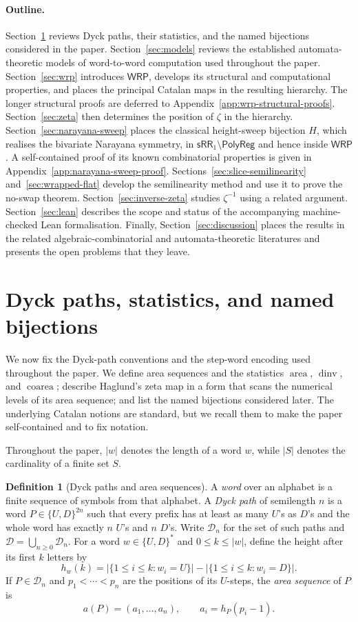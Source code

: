 \documentclass[11pt]{article}
\theoremstyle{definition}
\newtheorem{definition}[theorem]{Definition}
\newcommand{\D}{\mathcal D}
\newcommand{\WRP}{\mathsf{WRP}}
\newcommand{\SWR}{\mathsf{sRR}_1}
\newcommand{\area}{\operatorname{area}}
\newcommand{\dinv}{\operatorname{dinv}}
\newcommand{\coarea}{\operatorname{coarea}}
\newcommand{\polyreg}{\mathsf{PolyReg}}
\begin{document}
\paragraph{Outline.}

Section~\ref{sec:dyck} reviews Dyck paths, their statistics, and the named
bijections considered in the paper.  Section~\ref{sec:models} reviews the
established automata-theoretic models of word-to-word computation used
throughout the paper.  Section~\ref{sec:wrp} introduces $\WRP$, develops its
structural and computational properties, and places the principal Catalan
maps in the resulting hierarchy.  The longer structural proofs are deferred
to Appendix~\ref{app:wrp-structural-proofs}.  Section~\ref{sec:zeta} then
determines the position of $\zeta$ in the hierarchy.
Section~\ref{sec:narayana-sweep} places the classical height-sweep bijection
$H$, which realises the bivariate Narayana symmetry, in
$\SWR\setminus\polyreg$ and hence inside $\WRP$.  A self-contained proof of
its known combinatorial properties
is given in Appendix~\ref{app:narayana-sweep-proof}.
Sections~\ref{sec:slice-semilinearity} and~\ref{sec:wrapped-flat} develop the
semilinearity method and use it to prove the no-swap theorem.
Section~\ref{sec:inverse-zeta} studies $\zeta^{-1}$ using a related argument.
Section~\ref{sec:lean} describes the scope and status of the accompanying
machine-checked Lean formalisation.  Finally,
Section~\ref{sec:discussion} places the results in the related
algebraic-combinatorial and automata-theoretic literatures and presents the
open problems that they leave.


\section{Dyck paths, statistics, and named bijections}\label{sec:dyck}

We now fix the Dyck-path conventions and the step-word encoding used
throughout the paper.  We define area sequences and the statistics
$\area$, $\dinv$, and $\coarea$; describe Haglund's zeta map in a form
that scans the numerical levels of its area sequence; and list the named
bijections considered later.  The underlying Catalan notions are standard,
but we recall them to make the paper self-contained and to fix notation.

Throughout the paper, $|w|$ denotes the length of a word $w$, while $|S|$
denotes the cardinality of a finite set $S$.

\begin{definition}[Dyck paths and area sequences]
A \emph{word} over an alphabet is a finite sequence of symbols from that
alphabet.  A \emph{Dyck path} of semilength $n$ is a word
$P\in\{U,D\}^{2n}$ such that every prefix has at least as many $U$'s as $D$'s
and the whole word has exactly $n$ $U$'s and $n$ $D$'s.  Write $\D_n$ for the
set of such paths and $\D=\bigcup_{n\ge 0}\D_n$.  For a word
$w\in\{U,D\}^*$ and $0\le k\le |w|$, define the height after its first $k$
letters by
\[
   h_w(k)=|\{1\le i\le k:w_i=U\}|-|\{1\le i\le k:w_i=D\}|.
\]
If $P\in\D_n$ and $p_1<\cdots<p_n$ are the positions of its $U$-steps, the
\emph{area sequence} of $P$ is
\[
   a(P)=(a_1,\ldots,a_n),\qquad a_i=h_P(p_i-1).
\]
\end{definition}
\end{document}
